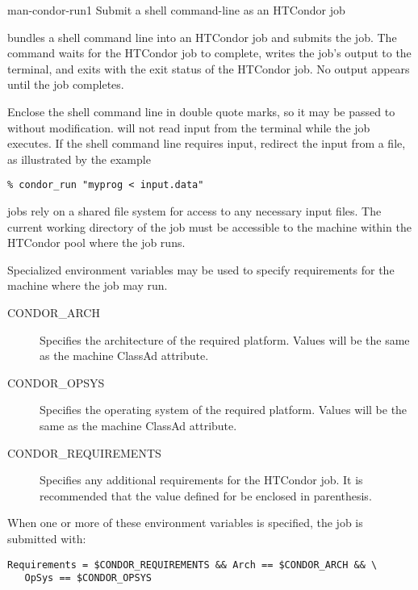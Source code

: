 \begin{ManPage}{}{man-condor-run}{1}
{Submit a shell command-line as an HTCondor job}

\Synopsis {}

\Description
{} bundles a shell command line into an HTCondor
job and submits the job.
The  command waits for the HTCondor job to complete,
writes the job's output to the terminal,
and exits with the exit status of the HTCondor job.
No output appears until the job completes.

Enclose the shell command line in double quote marks,
so it may be passed to
 without modification.
 will not read input from the terminal while the job
executes.  If the shell command line requires input,
redirect the input from a file, as illustrated by the example
\begin{verbatim}
% condor_run "myprog < input.data"
\end{verbatim}

 jobs rely on a shared file system for
access to any necessary input files.
The current working directory of the job must be
accessible to the machine within the HTCondor pool where the job runs.

Specialized environment variables may be used to specify
requirements for the machine where the job may run.

\begin{description}
\item[CONDOR\_ARCH] Specifies the architecture of the required
  platform. Values will be the same as the 
  machine ClassAd attribute.
\item[CONDOR\_OPSYS] Specifies the operating system of the required
  platform. Values will be the same as the 
  machine ClassAd attribute.
\item[CONDOR\_REQUIREMENTS] Specifies any additional requirements for
  the HTCondor job.  It is recommended that the value defined for
   be enclosed in parenthesis.
\end{description}

When one or more of these environment variables is specified, the job is
submitted with:

\begin{verbatim}
Requirements = $CONDOR_REQUIREMENTS && Arch == $CONDOR_ARCH && \
   OpSys == $CONDOR_OPSYS
\end{verbatim}


\end{ManPage}
